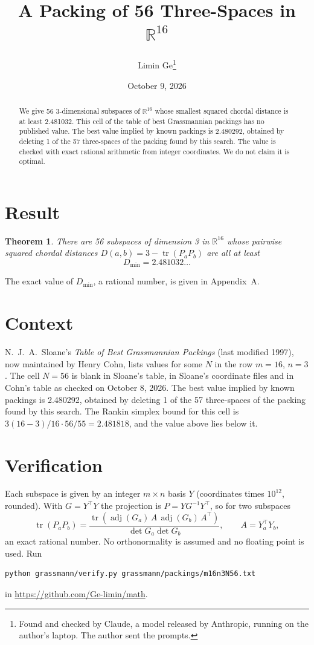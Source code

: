 \documentclass[11pt,a4paper]{article}
\title{A Packing of 56 Three-Spaces in $\mathbb{R}^{16}$}
\author{Limin Ge\thanks{Found and checked by Claude, a model released by Anthropic, running on the author's laptop. The author sent the prompts.}}
\date{October 9, 2026}
\newtheorem*{theorem}{Theorem}
\begin{document}
\maketitle
\begin{abstract}
We give 56 3-dimensional subspaces of $\mathbb{R}^{16}$ whose smallest squared chordal distance is at least 2.481032. This cell of the table of best Grassmannian packings has no published value. The best value implied by known packings is 2.480292, obtained by deleting 1 of the 57 three-spaces of the packing found by this search. The value is checked with exact rational arithmetic from integer coordinates. We do not claim it is optimal.
\end{abstract}

\section{Result}
\begin{theorem}
There are 56 subspaces of dimension 3 in $\mathbb{R}^{16}$ whose pairwise squared chordal distances $D(a,b) = 3 - \operatorname{tr}(P_aP_b)$ are all at least
\[ D_{\min} = 2.481032\ldots \]
\end{theorem}
The exact value of $D_{\min}$, a rational number, is given in Appendix~A.


\section{Context}
N.~J.~A.~Sloane's \emph{Table of Best Grassmannian Packings} (last modified 1997), now maintained by Henry Cohn, lists values for some $N$ in the row $m=16$, $n=3$. The cell $N=56$ is blank in Sloane's table, in Sloane's coordinate files and in Cohn's table as checked on October 8, 2026. The best value implied by known packings is 2.480292, obtained by deleting 1 of the 57 three-spaces of the packing found by this search. The Rankin simplex bound for this cell is $3(16-3)/16\cdot 56/55 = 2.481818$, and the value above lies below it.


\section{Verification}
Each subspace is given by an integer $m\times n$ basis $Y$ (coordinates times $10^{12}$, rounded). With $G=Y^\top Y$ the projection is $P=YG^{-1}Y^\top$, so for two subspaces
\[ \operatorname{tr}(P_aP_b)=\frac{\operatorname{tr}(\operatorname{adj}(G_a)\,A\,\operatorname{adj}(G_b)\,A^\top)}{\det G_a\det G_b},\qquad A=Y_a^\top Y_b, \]
an exact rational number. No orthonormality is assumed and no floating point is used. Run
\begin{verbatim}
python grassmann/verify.py grassmann/packings/m16n3N56.txt
\end{verbatim}
in \url{https://github.com/Ge-limin/math}.
\end{document}
